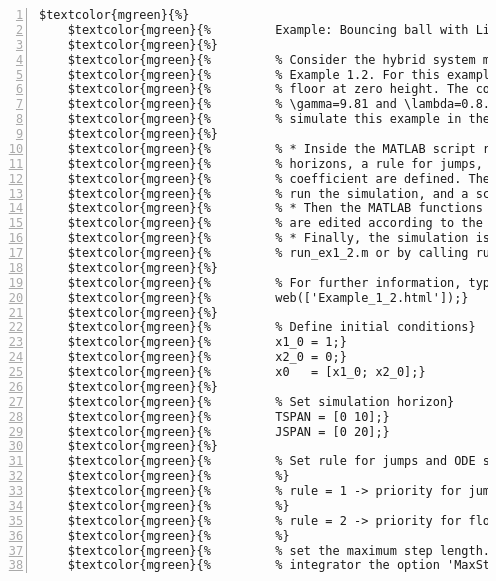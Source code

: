\begin{Verbatim}[commandchars=\$\{\},numbers=left,numbersep=2pt]
    $textcolor{mgreen}{%} 
    $textcolor{mgreen}{%         Example: Bouncing ball with Lite HyEQ Solver} 
    $textcolor{mgreen}{%} 
    $textcolor{mgreen}{%         % Consider the hybrid system model for the bouncing ball with data given in} 
    $textcolor{mgreen}{%         % Example 1.2. For this example, we consider the ball to be bouncing on a} 
    $textcolor{mgreen}{%         % floor at zero height. The constants for the bouncing ball system are} 
    $textcolor{mgreen}{%         % \gamma=9.81 and \lambda=0.8. The following procedure is used to} 
    $textcolor{mgreen}{%         % simulate this example in the Lite HyEQ Solver:} 
    $textcolor{mgreen}{%} 
    $textcolor{mgreen}{%         % * Inside the MATLAB script run_ex1_2.m, initial conditions, simulation} 
    $textcolor{mgreen}{%         % horizons, a rule for jumps, ode solver options, and a step size} 
    $textcolor{mgreen}{%         % coefficient are defined. The function HYEQSOLVER.m is called in order to} 
    $textcolor{mgreen}{%         % run the simulation, and a script for plotting solutions is included.} 
    $textcolor{mgreen}{%         % * Then the MATLAB functions f_ex1_2.m, C_ex1_2.m, g_ex1_2.m, D_ex1_2.m} 
    $textcolor{mgreen}{%         % are edited according to the data given below.} 
    $textcolor{mgreen}{%         % * Finally, the simulation is run by clicking the run button in} 
    $textcolor{mgreen}{%         % run_ex1_2.m or by calling run_ex1_2.m in the MATLAB command window.} 
    $textcolor{mgreen}{%} 
    $textcolor{mgreen}{%         % For further information, type in the command window:} 
    $textcolor{mgreen}{%         web(['Example_1_2.html']);} 
    $textcolor{mgreen}{%} 
    $textcolor{mgreen}{%         % Define initial conditions} 
    $textcolor{mgreen}{%         x1_0 = 1;} 
    $textcolor{mgreen}{%         x2_0 = 0;} 
    $textcolor{mgreen}{%         x0   = [x1_0; x2_0];} 
    $textcolor{mgreen}{%} 
    $textcolor{mgreen}{%         % Set simulation horizon} 
    $textcolor{mgreen}{%         TSPAN = [0 10];} 
    $textcolor{mgreen}{%         JSPAN = [0 20];} 
    $textcolor{mgreen}{%} 
    $textcolor{mgreen}{%         % Set rule for jumps and ODE solver options} 
    $textcolor{mgreen}{%         %} 
    $textcolor{mgreen}{%         % rule = 1 -> priority for jumps} 
    $textcolor{mgreen}{%         %} 
    $textcolor{mgreen}{%         % rule = 2 -> priority for flows} 
    $textcolor{mgreen}{%         %} 
    $textcolor{mgreen}{%         % set the maximum step length. At each run of the} 
    $textcolor{mgreen}{%         % integrator the option 'MaxStep' is set to} 

\end{Verbatim}
